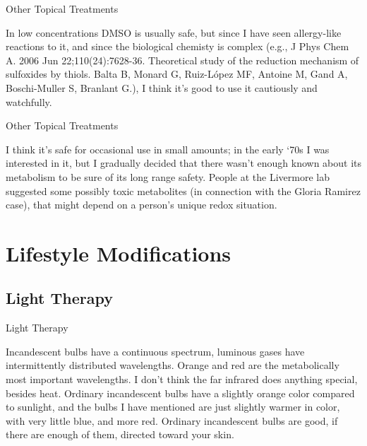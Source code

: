\documentclass[11pt,oneside,openany,extrafontsizes]{memoir}
\begin{document}
\begin{standalonequote}{Other Topical Treatments}

    \begin{answer}
      In low concentrations DMSO is usually safe, but since I have seen allergy-like reactions to it, and since the biological chemisty is complex (e.g., J Phys Chem A. 2006 Jun 22;110(24):7628-36. Theoretical study of the reduction mechanism of sulfoxides by thiols. Balta B, Monard G, Ruiz-López MF, Antoine M, Gand A, Boschi-Muller S, Branlant G.), I think it's good to use it cautiously and watchfully.
    \end{answer}
\end{standalonequote}

\begin{standalonequote}{Other Topical Treatments}

    \begin{answer}
      I think it's safe for occasional use in small amounts; in the early ‘70s I was interested in it, but I gradually decided that there wasn't enough known about its metabolism to be sure of its long range safety. People at the Livermore lab suggested some possibly toxic metabolites (in connection with the Gloria Ramirez case), that might depend on a person's unique redox situation.
    \end{answer}
\end{standalonequote}

\section{Lifestyle Modifications}

\subsection{Light Therapy}

\begin{standalonequote}{Light Therapy}

    \begin{answer}
        Incandescent bulbs have a continuous spectrum, luminous gases have intermittently distributed wavelengths. Orange and red are the metabolically most important wavelengths. I don't think the far infrared does anything special, besides heat. Ordinary incandescent bulbs have a slightly orange color compared to sunlight, and the bulbs I have mentioned are just slightly warmer in color, with very little blue, and more red. Ordinary incandescent bulbs are good, if there are enough of them, directed toward your skin.
    \end{answer}
\end{standalonequote}
\end{document}
